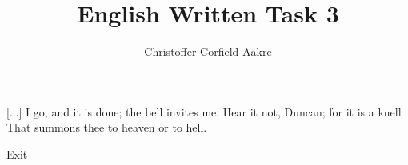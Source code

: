 \documentclass{article}
\title{English Written Task 3}
\author{Christoffer Corfield Aakre}
\begin{document}
\maketitle
{}

\begin{dramatis}
\end{dramatis}

\setcounter{act}{1}
\act{}
\scene{}
[...] I go, and it is done; the bell invites me.
Hear it not, Duncan; for it is a knell
That summons thee to heaven or to hell.
\begin{dida}
Exit
\end{dida}
\end{document}
